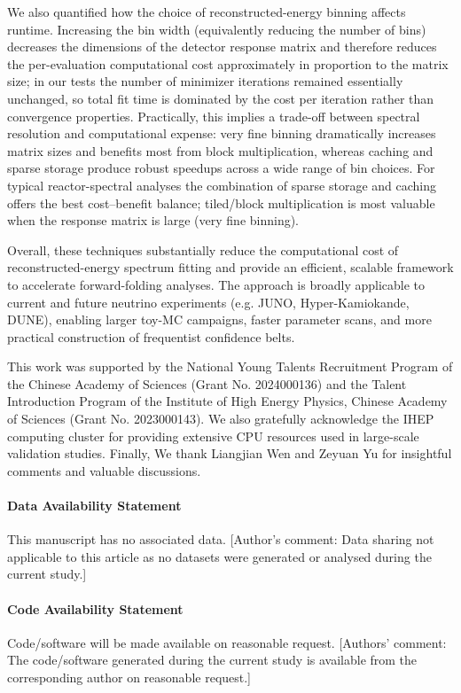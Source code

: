 \documentclass[xetex,twocolumn,epjc3]{svjour3}
\newenvironment{dataavailability}{\paragraph{Data Availability Statement}}{}
\newenvironment{codeavailability}{\paragraph{Code Availability Statement}}{}
\begin{document}
We also quantified how the choice of reconstructed-energy binning affects runtime. Increasing the bin width (equivalently reducing the number of bins) decreases the dimensions of the detector response matrix and therefore reduces the per-evaluation computational cost approximately in proportion to the matrix size; in our tests the number of minimizer iterations remained essentially unchanged, so total fit time is dominated by the cost per iteration rather than convergence properties. Practically, this implies a trade-off between spectral resolution and computational expense: very fine binning dramatically increases matrix sizes and benefits most from block multiplication, whereas caching and sparse storage produce robust speedups across a wide range of bin choices. For typical reactor-spectral analyses the combination of sparse storage and caching offers the best cost–benefit balance; tiled/block multiplication is most valuable when the response matrix is large (very fine binning).

Overall, these techniques substantially reduce the computational cost of reconstructed-energy spectrum fitting and provide an efficient, scalable framework to accelerate forward-folding analyses. The approach is broadly applicable to current and future neutrino experiments (e.g. JUNO, Hyper-Kamiokande, DUNE), enabling larger toy-MC campaigns, faster parameter scans, and more practical construction of frequentist confidence belts.

\begin{acknowledgements}
This work was supported by the National Young Talents Recruitment Program of the Chinese Academy of Sciences (Grant No. 2024000136) and the Talent Introduction Program of the Institute of High Energy Physics, Chinese Academy of Sciences (Grant No. 2023000143). We also gratefully acknowledge the IHEP computing cluster for providing extensive CPU resources used in large-scale validation studies. Finally, We thank Liangjian Wen and Zeyuan Yu for insightful comments and valuable discussions.
\end{acknowledgements}

\begin{dataavailability}
This manuscript has no associated data. [Author’s comment: Data sharing not applicable to this article as no datasets were generated or analysed during the current study.]
\end{dataavailability}

\begin{codeavailability}
Code/software will be made available on reasonable request. [Authors’ comment: The code/software generated  during the current study is available from the corresponding author on reasonable request.]
\end{codeavailability}



\end{document}
